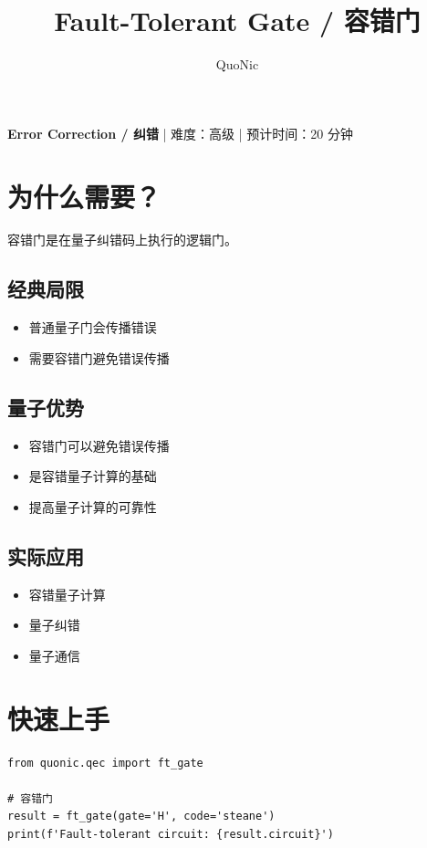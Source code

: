 \documentclass[12pt,a4paper]{article}
\title{Fault-Tolerant Gate / 容错门}
\author{QuoNic}
\date{}
\begin{document}
\maketitle

\begin{center}
\textbf{Error Correction / 纠错} | 难度：高级 | 预计时间：20 分钟
\end{center}

\tableofcontents
\newpage

\section{为什么需要？}

容错门是在量子纠错码上执行的逻辑门。

\subsection{经典局限}
\begin{itemize}
  \item 普通量子门会传播错误
  \item 需要容错门避免错误传播
\end{itemize}

\subsection{量子优势}
\begin{itemize}
  \item 容错门可以避免错误传播
  \item 是容错量子计算的基础
  \item 提高量子计算的可靠性
\end{itemize}

\subsection{实际应用}
\begin{itemize}
  \item 容错量子计算
  \item 量子纠错
  \item 量子通信
\end{itemize}

\section{快速上手}

\begin{verbatim}
from quonic.qec import ft_gate

# 容错门
result = ft_gate(gate='H', code='steane')
print(f'Fault-tolerant circuit: {result.circuit}')
\end{verbatim}
\end{document}
